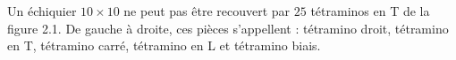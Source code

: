 Un échiquier $10 \times 10$ ne peut pas être recouvert par $25$ tétraminos en T de la figure 2.1. De gauche à droite, ces pièces s'appellent : tétramino droit, tétramino en T, tétramino carré, tétramino en L et tétramino biais.

